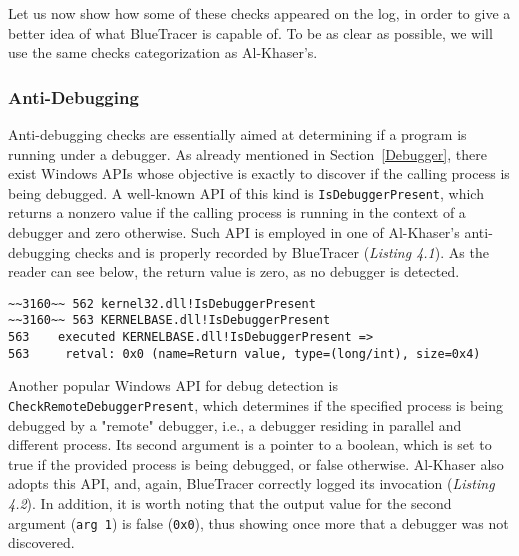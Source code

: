 Let us now show how some of these checks appeared on the log, in order to give a better idea of what BlueTracer is capable of. To be as clear as possible, we will use the same checks categorization as Al-Khaser's.

\subsubsection*{Anti-Debugging}

Anti-debugging checks are essentially aimed at determining if a program is running under a debugger. As already mentioned in Section~\ref{Debugger}, there exist Windows APIs whose objective is exactly to discover if the calling process is being debugged.
A well-known API of this kind is \texttt{IsDebuggerPresent}, which returns a nonzero value if the calling process is running in the context of a debugger and zero otherwise. Such API is employed in one of Al-Khaser's anti-debugging checks and is properly recorded by BlueTracer (\textit{Listing 4.1}). As the reader can see below, the return value is zero, as no debugger is detected.

\vspace{0.5cm}
\begin{lstlisting}[caption={Log entry relative to \texttt{IsDebuggerPresent}},captionpos=b]
~~3160~~ 562 kernel32.dll!IsDebuggerPresent
~~3160~~ 563 KERNELBASE.dll!IsDebuggerPresent
563    executed KERNELBASE.dll!IsDebuggerPresent =>
563 	retval: 0x0 (name=Return value, type=(long/int), size=0x4)
\end{lstlisting}

Another popular Windows API for debug detection is \texttt{CheckRemoteDebuggerPresent}, which determines if the specified process is being debugged by a "remote" debugger, i.e., a debugger residing in parallel and different process. Its second argument is a pointer to a boolean, which is set to true if the provided process is being debugged, or false otherwise. Al-Khaser also adopts this API, and, again, BlueTracer correctly logged its invocation (\textit{Listing 4.2}). In addition, it is worth noting that the output value for the second argument (\texttt{arg 1}) is 
false (\texttt{0x0}), thus showing once more that a debugger was not discovered.   

